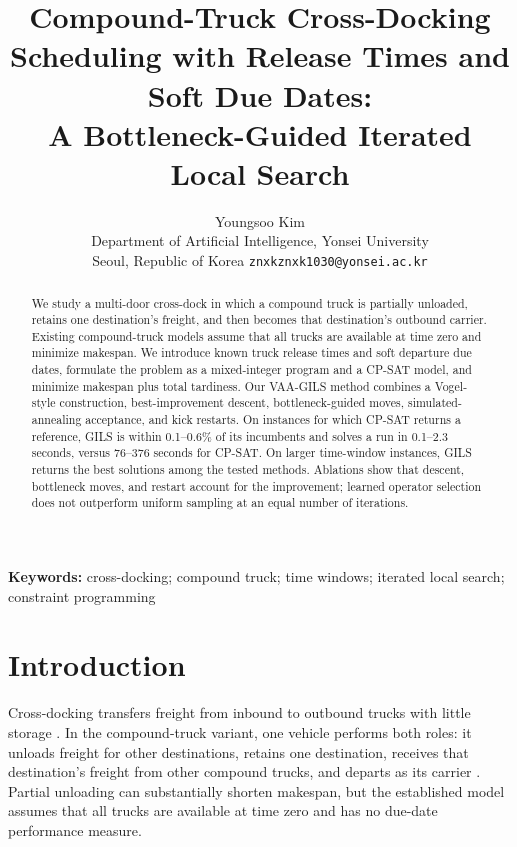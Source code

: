 \documentclass[11pt,a4paper]{article}
\title{\vspace{-8mm}\textbf{Compound-Truck Cross-Docking Scheduling with Release Times and Soft Due Dates:\\A Bottleneck-Guided Iterated Local Search}}
\author{Youngsoo Kim\\
\small Department of Artificial Intelligence, Yonsei University\\
\small Seoul, Republic of Korea \quad \texttt{znxkznxk1030@yonsei.ac.kr}}
\date{}
\begin{document}
\maketitle
\vspace{-5mm}

\begin{abstract}
We study a multi-door cross-dock in which a compound truck is partially
unloaded, retains one destination's freight, and then becomes that
destination's outbound carrier. Existing compound-truck models assume that
all trucks are available at time zero and minimize makespan. We introduce
known truck release times and soft departure due dates, formulate the problem
as a mixed-integer program and a CP-SAT model, and minimize makespan plus total
tardiness. Our VAA-GILS method combines a Vogel-style construction,
best-improvement descent, bottleneck-guided moves, simulated-annealing
acceptance, and kick restarts. On instances for which CP-SAT returns a
reference, GILS is within 0.1--0.6\% of its incumbents and solves a run in
0.1--2.3 seconds, versus 76--376 seconds for CP-SAT. On larger time-window
instances, GILS returns the best solutions among the tested methods. Ablations
show that descent, bottleneck moves, and restart account for the improvement;
learned operator selection does not outperform uniform sampling at an equal number of iterations.
\end{abstract}

\noindent\textbf{Keywords:} cross-docking; compound truck; time windows;
iterated local search; constraint programming

\section{Introduction}

Cross-docking transfers freight from inbound to outbound trucks with little
storage \cite{boysen2010,vanbelle2012}. In the compound-truck variant, one vehicle performs both roles: it
unloads freight for other destinations, retains one destination, receives that
destination's freight from other compound trucks, and departs as its carrier
\cite{joo2013,shahmardan2020}. Partial unloading can substantially shorten
makespan, but the established model assumes that all trucks are available at
time zero and has no due-date performance measure.
\end{document}
